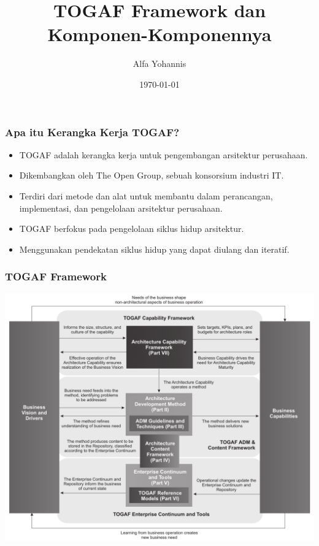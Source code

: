 \documentclass{beamer}
\title{TOGAF Framework dan Komponen-Komponennya}
\author{Alfa Yohannis}
\date{\today}
\begin{document}
	
	\frame{\titlepage}
	
	\begin{frame}
		\frametitle{Apa itu Kerangka Kerja TOGAF?}
		\begin{itemize}
			\item TOGAF adalah kerangka kerja untuk pengembangan arsitektur perusahaan.
			\item Dikembangkan oleh The Open Group, sebuah konsorsium industri IT.
			\item Terdiri dari metode dan alat untuk membantu dalam perancangan, implementasi, dan pengelolaan arsitektur perusahaan.
			\item TOGAF berfokus pada pengelolaan siklus hidup arsitektur.
			\item Menggunakan pendekatan siklus hidup yang dapat diulang dan iteratif.
		\end{itemize}
	\end{frame}
	
	{
		\begin{frame}
			\frametitle{TOGAF Framework}
			\begin{center}
				\includegraphics[width=.95\textwidth]{../figures/togaf}
			\end{center}
		\end{frame}
	}
	
\end{document}
